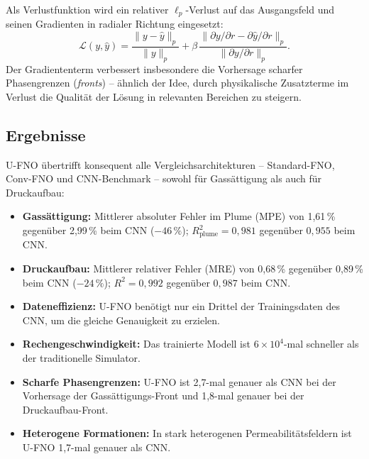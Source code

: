 \documentclass[a4paper,12pt]{article}
\begin{document}
Als Verlustfunktion wird ein relativer $\ell_p$-Verlust auf das Ausgangsfeld
und seinen Gradienten in radialer Richtung eingesetzt:
\[
    \mathcal{L}(y, \hat{y}) =
    \frac{\|y - \hat{y}\|_p}{\|y\|_p}
    + \beta\,\frac{\|\partial y/\partial r - \partial\hat{y}/\partial r\|_p}{\|\partial y/\partial r\|_p}.
\]
Der Gradiententerm verbessert insbesondere die Vorhersage scharfer Phasengrenzen
(\emph{fronts}) -- ähnlich der Idee, durch physikalische Zusatzterme im Verlust die
Qualität der Lösung in relevanten Bereichen zu steigern.

\subsection*{Ergebnisse}

U-FNO übertrifft konsequent alle Vergleichsarchitekturen -- Standard-FNO,
Conv-FNO und CNN-Benchmark -- sowohl für Gassättigung als auch für
Druckaufbau:

\begin{itemize}
    \item \textbf{Gassättigung:} Mittlerer absoluter Fehler im Plume
    (MPE) von 1{,}61\,\% gegenüber 2{,}99\,\% beim CNN ($-46\,\%$);
    $R^2_\mathrm{plume} = 0{,}981$ gegenüber $0{,}955$ beim CNN.

    \item \textbf{Druckaufbau:} Mittlerer relativer Fehler (MRE) von
    0{,}68\,\% gegenüber 0{,}89\,\% beim CNN ($-24\,\%$);
    $R^2 = 0{,}992$ gegenüber $0{,}987$ beim CNN.

    \item \textbf{Dateneffizienz:} U-FNO benötigt nur ein Drittel der
    Trainingsdaten des CNN, um die gleiche Genauigkeit zu erzielen.

    \item \textbf{Rechengeschwindigkeit:} Das trainierte Modell ist
    $6 \times 10^4$-mal schneller als der traditionelle Simulator.

    \item \textbf{Scharfe Phasengrenzen:} U-FNO ist 2{,}7-mal genauer
    als CNN bei der Vorhersage der Gassättigungs-Front und 1{,}8-mal
    genauer bei der Druckaufbau-Front.

    \item \textbf{Heterogene Formationen:} In stark heterogenen Permeabilitätsfeldern
    ist U-FNO 1{,}7-mal genauer als CNN.
\end{itemize}
\end{document}
